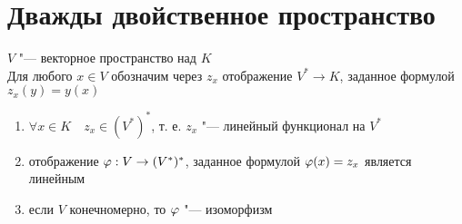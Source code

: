 \section{Дважды двойственное пространство}

\begin{theorem}
	$ V $ "--- векторное пространство над $ K $ \\
	Для любого $ x \in V $ обозначим через $ z_x $ отображение $ V^* \to K $, заданное формулой $ z_x(y) = y(x) $

	\begin{enumerate}
		\item $ \forall x \in K \quad z_x \in (V^*)^* $, т. е. $ z_x $ "--- линейный функционал на $ V^* $

		\item отображение $ \varphi : V \to (V^*)^* $, заданное формулой $ \varphi(x) = z_x $ является линейным

		\item если $ V $ конечномерно, то $ \varphi $ "--- изоморфизм
	\end{enumerate}
\end{theorem}


